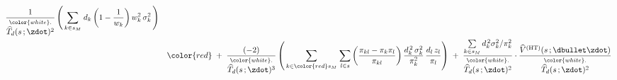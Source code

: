 \begin{itemize}
\begin{eqnarray*}
{        \dfrac{
            1
            }{
            \overset{{\color{white}.}}{
                \widehat{T}_{d}(s\,;\zdot)^{2}
                }
            }
        \left(\,
            \underset{k \in s_{M}}{\sum}\;
            d_{k}
            \left(1-\dfrac{1}{w_{k}}\right)
            w_{k}^{2}\,\sigma_{k}^{2}
            \,\right)
        }
    \\
    &&
        {\color{red}
        \; + \;
        \dfrac{
            (-2)
            }{
            \overset{{\color{white}.}}{
                \widehat{T}_{d}(s\,;\zdot)^{3}
                }
            }
        \left(\,
            \underset{k \in {\color{red}s_{M}}}{\sum}\;
            \underset{l \in s}{\sum}
                \left(\dfrac{\pi_{kl}-\pi_{k}\pi_{l}}{\pi_{kl}}\right)
                \dfrac{d_{k}^{\,2}\,\sigma^{2}_{k}}{\pi_{k}^{2}}\,
                \dfrac{d_{l}\,z_{l}}{\pi_{l}}
            \right)
        \; + \;
        \dfrac{
            \underset{k \in s_{M}}{\sum}\,d_{k}^{\,2}\sigma^{2}_{k}/\pi_{k}^{2}
            }{
            \overset{{\color{white}.}}{
                \widehat{T}_{d}(s\,;\zdot)^{2}
                }
            }
        \cdot
        \dfrac{
            \widehat{V}^{\textnormal{(HT)}}(s\,;\dbullet\zdot)
            }{
            \overset{{\color{white}.}}{
                \widehat{T}_{d}(s\,;\zdot)^{2}
                }
            }
        }
    \end{eqnarray*}

\end{itemize}
